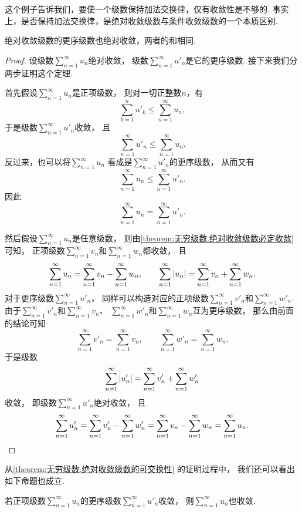 这个例子告诉我们，要使一个级数保持加法交换律，仅有收敛性是不够的.
事实上，是否保持加法交换律，是绝对收敛级数与条件收敛级数的一个本质区别.

\begin{theorem}[绝对收敛级数的可交换性]\label{theorem:无穷级数.绝对收敛级数的可交换性}
绝对收敛级数的更序级数也绝对收敛，两者的和相同.
\begin{proof}
设级数\(\sum_{n=1}^\infty u_n\)绝对收敛，
级数\(\sum_{n=1}^\infty u'_n\)是它的更序级数.
接下来我们分两步证明这个定理.

首先假设\(\sum_{n=1}^\infty u_n\)是正项级数，
则对一切正整数\(n\)，有\[
	\sum_{k=1}^n u'_k
	\leq \sum_{n=1}^\infty u_n,
\]
于是级数\(\sum_{n=1}^\infty u'_n\)收敛，
且\[
	\sum_{n=1}^\infty u'_n
	\leq \sum_{n=1}^\infty u_n.
\]
反过来，也可以将\(\sum_{n=1}^\infty u_n\)
看成是\(\sum_{n=1}^\infty u'_n\)的更序级数，
从而又有\[
	\sum_{n=1}^\infty u_n
	\leq \sum_{n=1}^\infty u'_n.
\]
因此\[
	\sum_{n=1}^\infty u_n
	= \sum_{n=1}^\infty u'_n.
\]

然后假设\(\sum_{n=1}^\infty u_n\)是任意级数，
则由\cref{theorem:无穷级数.绝对收敛级数必定收敛} 可知，
正项级数\(\sum_{n=1}^\infty v_n\)和\(\sum_{n=1}^\infty w_n\)都收敛，
且\[
	\sum_{n=1}^\infty u_n
	= \sum_{n=1}^\infty v_n
	- \sum_{n=1}^\infty w_n,
	\qquad
	\sum_{n=1}^\infty \abs{u_n}
	= \sum_{n=1}^\infty v_n
	+ \sum_{n=1}^\infty w_n.
\]
对于更序级数\(\sum_{n=1}^\infty u'_n\)，
同样可以构造对应的正项级数\(\sum_{n=1}^\infty v'_n\)和\(\sum_{n=1}^\infty w'_n\).
由于\(\sum_{n=1}^\infty v'_n\)和\(\sum_{n=1}^\infty v_n\)、
\(\sum_{n=1}^\infty w'_n\)和\(\sum_{n=1}^\infty w_n\)互为更序级数，
那么由前面的结论可知\[
	\sum_{n=1}^\infty v'_n
	= \sum_{n=1}^\infty v_n,
	\qquad
	\sum_{n=1}^\infty w'_n
	= \sum_{n=1}^\infty w_n.
\]
于是级数\[
	\sum_{n=1}^\infty \abs{u'_n}
	= \sum_{n=1}^\infty v'_n
	+ \sum_{n=1}^\infty w'_n
\]收敛，
即级数\(\sum_{n=1}^\infty u'_n\)绝对收敛，
且\[
	\sum_{n=1}^\infty u'_n
	= \sum_{n=1}^\infty v'_n
	- \sum_{n=1}^\infty w'_n
	= \sum_{n=1}^\infty v_n
	- \sum_{n=1}^\infty w_n
	= \sum_{n=1}^\infty u_n.
	\qedhere
\]
\end{proof}
\end{theorem}

从\cref{theorem:无穷级数.绝对收敛级数的可交换性} 的证明过程中，
我们还可以看出如下命题也成立.
\begin{proposition}
若正项级数\(\sum_{n=1}^\infty u_n\)的更序级数\(\sum_{n=1}^\infty u'_n\)收敛，
则\(\sum_{n=1}^\infty u_n\)也收敛.
\end{proposition}

